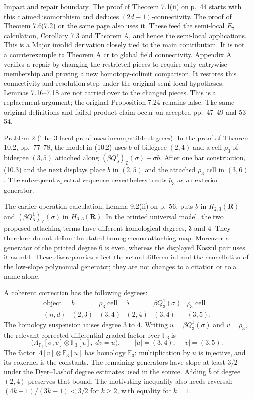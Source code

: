 \documentclass[10pt]{article}
\begin{document}
Impact and repair boundary. The proof of Theorem 7.1(ii) on p. 44 starts with this claimed isomorphism and deduces \((2d-1)\)-connectivity. The proof of Theorem 7.6(7.2) on the same page also uses it. These feed the semi-local \(E_2\) calculation, Corollary 7.3 and Theorem A, and hence the semi-local applications. This is a Major invalid derivation closely tied to the main contribution. It is not a counterexample to Theorem A or to global field connectivity. Appendix A verifies a repair by changing the restricted pieces to require only entrywise membership and proving a new homotopy-colimit comparison. It restores this connectivity and resolution step under the original semi-local hypotheses. Lemmas 7.16–7.18 are not carried over to the changed pieces. This is a replacement argument; the original Proposition 7.24 remains false. The same original definitions and failed product claim occur on accepted pp. 47–49 and 53–54.\par
Problem 2 (The \(3\)-local proof uses incompatible degrees).  In the proof of Theorem 10.2, pp. 77–78, the model in (10.2) uses \(b\) of bidegree \((2,4)\) and a cell \(\rho_3\) of bidegree \((3,5)\) attached along \((\beta Q^1_3)_\mathbb Z(\sigma)-\sigma b\). After one bar construction, (10.3) and the next displays place \(\bar b\) in \((2,5)\) and the attached \(\bar\rho_3\) cell in \((3,6)\). The subsequent spectral sequence nevertheless treats \(\bar\rho_3\) as an exterior generator.\par
The earlier operation calculation, Lemma 9.2(ii) on p. 56, puts \(b\) in \(H_{2,3}(\mathbf R)\) and \((\beta Q^1_3)_\mathbb Z(\sigma)\) in \(H_{3,3}(\mathbf R)\). In the printed universal model, the two proposed attaching terms have different homological degrees, \(3\) and \(4\). They therefore do not define the stated homogeneous attaching map. Moreover a generator of the printed degree \(6\) is even, whereas the displayed Koszul pair uses it as odd. These discrepancies affect the actual differential and the cancellation of the low-slope polynomial generator; they are not changes to a citation or to a name alone.\par
A coherent correction has the following degrees: \[\begin{array}{c|ccccc}
 \text{object}&b&\rho_3\text{ cell}&\bar b&
       \beta Q^1_3(\bar\sigma)&\bar\rho_3\text{ cell}\\ \hline
 (n,d)&(2,3)&(3,4)&(2,4)&(3,4)&(3,5).
\end{array}\] The homology suspension raises degree \(3\) to \(4\). Writing \(u=\beta Q^1_3(\bar\sigma)\) and \(v=\bar\rho_3\), the relevant corrected differential graded factor over \(\mathbb F_3\) is \[\bigl(\Lambda_{\mathbb F_3}[\bar\sigma,v]\otimes\mathbb F_3[u],
        \ d v=u\bigr),\qquad |u|=(3,4),\quad |v|=(3,5).\] The factor \(\Lambda[v]\otimes\mathbb F_3[u]\) has homology \(\mathbb F_3\): multiplication by \(u\) is injective, and its cokernel is the constants. The remaining generators have slope at least \(3/2\) under the Dyer–Lashof degree estimates used in the source. Adding \(\bar b\) of degree \((2,4)\) preserves that bound. The motivating inequality also needs reversal: \((4k-1)/(3k-1)<3/2\) for \(k\geq2\), with equality for \(k=1\).\par
\end{document}
